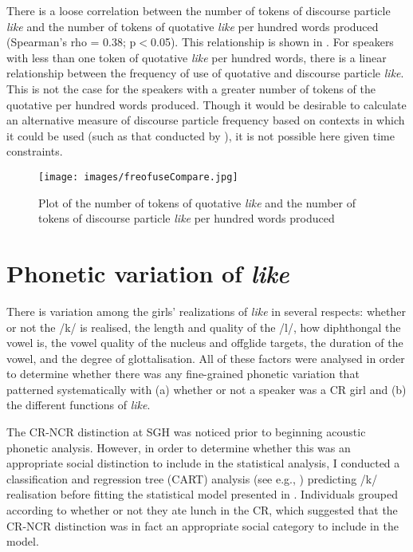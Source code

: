 \largerpage
There is a loose correlation between the number of tokens of discourse particle \textit{like} and the number of tokens of quotative \textit{like} per hundred words produced (Spearman's rho = 0.38; p$<$0.05). This relationship is shown in . For speakers with less than one token of quotative \textit{like} per hundred words, there is a linear relationship between the frequency of use of quotative and discourse particle \textit{like}. This is not the case for the speakers with a greater number of tokens of the quotative per hundred words produced. Though it would be desirable to calculate an alternative measure of discourse particle frequency based on contexts in which it could be used (such as that conducted by \citealt{darcy2005}), it is not possible here given time constraints. 

\clearpage
\begin{figure} 
	\centering
		\texttt{[image: images/freofuseCompare.jpg]}
	\caption{Plot of the number of tokens of quotative \textit{like} and the number of tokens of discourse particle \textit{like} per hundred words produced}
	\label{fig:ComparingQDP}
\end{figure}



\section{Phonetic variation of \textit{like}}\label{sec:phoneticlike}

There is variation among the girls' realizations of \textit{like} in several respects: whether or not the /k/ is realised, the length and quality of the /l/, how diphthongal the vowel is, the vowel quality of the nucleus and offglide targets, the duration of the vowel, and the degree of glottalisation. All of these factors were analysed in order to determine whether there was any fine-grained phonetic variation that patterned systematically with (a) whether or not a speaker was a CR girl and (b) the different functions of \textit{like}. 


The CR-NCR distinction at SGH was noticed prior to beginning acoustic phonetic analysis. However, in order to determine whether this was an appropriate social distinction to include in the statistical analysis, I conducted a classification and regression tree (CART) analysis (see e.g., \citealt{breimanetal1984}) predicting /k/ realisation before fitting the statistical model presented in . Individuals grouped according to whether or not they ate lunch in the CR, which suggested that the CR-NCR distinction was in fact an appropriate social category to include in the model. \nocite{breimanetal1984}



